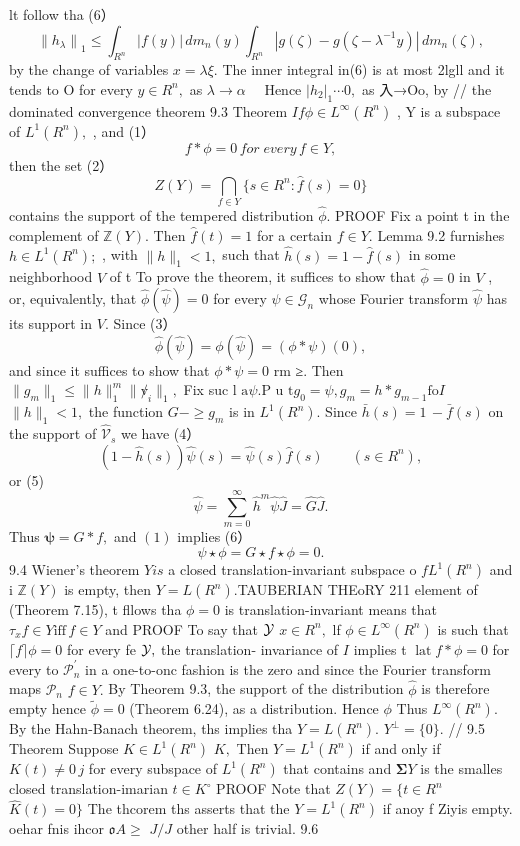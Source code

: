 lt follow tha (6） $$ \left\|h_{\lambda}\right\|_{1}\leq\int_{R^{n}}\left|f(y)\right|\,d m_{n}(y)\int_{R^{n}}\left|g(\zeta)-g(\zeta-\lambda^{-1}y)\right|\,d m_{n}(\zeta), $$ by the change of variables $x=\lambda\xi.$ The inner integral in(6) is at most 2lgll and it tends to O for every $y\in R^{n},$ as $\lambda\to\alpha\quad$ Hence $|h_{2}|_{1}\cdots0,$ as 入→Oo, by // the dominated convergence theorem 9.3 Theorem $I f\phi\in L^{\infty}(R^{n})$ , Y is a subspace of $L^{1}(R^{n}),$ , and (1） $$ f*\phi=0\,f o r\;e v e r y\,f\in Y, $$ then the set (2） $$ Z(Y)=\bigcap_{f\in Y}\{s\in R^{n}:{\hat{f}}(s)=0\} $$ contains the support of the tempered distribution ${\hat{\phi}}.$ PROOF Fix a point t in the complement of $\mathbb{Z}(Y).$ Then ${\hat{f}}(t)=1$ for a certain $f\in Y.$ Lemma 9.2 furnishes $h\in L^{1}(R^{n});$ , with $\|h\|_{1}<1,$ such that ${\hat{h}}(s)=1-{\hat{f}}(s)$ in some neighborhood ${\mathbf{}}V$ of t To prove the theorem, it suffices to show that ${\hat{\phi}}=0$ in ${\mathbf{}}V$ , or, equivalently, that ${\hat{\phi}}({\hat{\psi}})=0$ for every $\psi\in{\mathcal{G}}_{n}$ whose Fourier transform $\hat{\psi}$ has its support in ${\mathit{V}}.$ Since (3） $$ \hat{\phi}(\hat{\psi})=\phi(\hat{\psi})=(\phi\ast\psi)(0), $$ and since it suffices to show that $\phi*\psi=0$ rm ≥. Then $\|g_{m}\|_{1}\leq\|h\|_{1}^{m}\|\not v_{i}\|_{1},$ Fix suc ${\textrm{l a}}\psi.{\textrm{P u t}}g_{0}=\psi,g_{m}=h*g_{m-1}\mathrm{fo}I$ $\|h\|_{1}<1,$ the function $G-\geq g_{m}$ is in $L^{1}(R^{n}).$ Since $\bar{h}(s)=1\,-\bar{f}(s)$ on the support of ${\widehat{\mathcal{V}}}_{s}$ we have (4） $$ (1-\hat{h}(s))\hat{\psi}(s)=\hat{\psi}(s)\hat{f}(s)\qquad(s\in R^{n}), $$ or (5) $$ \hat{\psi}=\sum_{m=0}^{\infty}\hat{h}^{m}\hat{\psi}\hat{J}=\hat{G}\hat{J}. $$ Thus ${\boldsymbol{\psi}}=G*f,$ and $(1)$ implies (6） $$ \psi\star\phi=G\star f\star\phi=0. $$ 9.4 Wiener's theorem $\textstyle Y i s$ a closed translation-invariant subspace o $f L^{1}(R^{n})$ and i $\mathbb{Z}(Y)$ is empty, then $Y=L(R^{n}).$TAUBERIAN THEoRY 211 element of (Theorem 7.15), t fllows tha $\phi=0$ is translation-invariant means that $\tau_{x}f\in Y\mathrm{iff}\,f\in Y$ and PROOF To say that ${\cal{Y}}$ $x\in R^{n},$ lf $\phi\in L^{\infty}(R^{n})$ is such that $\textstyle{\lceil f\rceil\phi=0}$ for every fe ${\cal{Y}},$ the translation- invariance of $\boldsymbol{\mathit{I}}$ implies t $\operatorname{lat}f*\phi=0$ for every to ${\mathcal{P}}_{n}^{\prime}$ in a one-to-onc fashion is the zero and since the Fourier transform maps ${\mathcal{P}}_{n}$ $\scriptstyle f\in Y.$ By Theorem 9.3, the support of the distribution $\hat{\phi}$ is therefore empty hence ${\tilde{\phi}}=0$ (Theorem 6.24), as a distribution. Hence $\phi$ Thus $L^{\infty}(R^{n}).$ By the Hahn-Banach theorem, ths implies tha $Y=L(R^{n}).$ $Y^{\perp}=\{0\}.$ // 9.5 Theorem Suppose $K\in L^{1}(R^{n})$ $K,$ Then $Y=L^{1}(R^{n})$ if and only if $K(t)\neq0\,j$ for every subspace of $L^{1}(R^{n})$ that contains and $\mathbf{\Sigma}Y$ is the smalles closed translation-imarian $\scriptstyle t\in K^{\circ}$ PROOF Note that $Z(Y)=\{t\in R^{n}$ ${\hat{K}}(t)=0\}$ The thcorem ths asserts that the $Y=L^{1}(R^{n})$ if anoy f Ziyis empty. oehar fnis ihcor $\mathfrak{o}A\!\!\!\geq$ $J/J$ other half is trivial. 9.6 